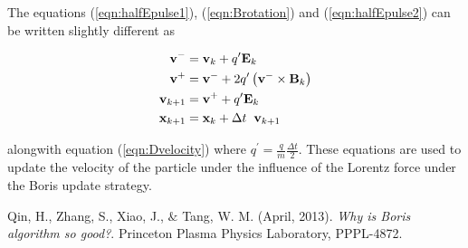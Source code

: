 \documentclass[12pt]{article}
\begin{document}
{		\noindent
		The equations (\ref{eqn:halfEpulse1}), (\ref{eqn:Brotation}) and (\ref{eqn:halfEpulse2}) can be written slightly different as 
		 
		 \begin{center}
		 \begin{tcolorbox}[width=8cm]
		 
		 \begin{equation}
		 		\begin{split}
		 		\textbf{v}^{-} & = \textbf{v}_{k} + q^{\prime} \textbf{E}_{k} \\
		 		\textbf{v}^{+} & = \textbf{v}^{-} + 2 q^{\prime} \left( \textbf{v}^{-} \times \textbf{B}_{k} \right) \\
		 		\textbf{v}_{k+1} & = \textbf{v}^{+} + q^{\prime} \textbf{E}_{k} \\
		 		\textbf{x}_{k+1} & = \textbf{x}_{k} + \Delta t \hspace{0.2cm}\textbf{v}_{k+1}
		 		\end{split}	 			
	 	\end{equation}
		\end{tcolorbox}
		\end{center}
	
	alongwith equation (\ref{eqn:Dvelocity}) where $q^{\prime} = \frac{\displaystyle q}{\displaystyle m} \frac{\displaystyle \Delta t}{ 2}$. These equations are used to update the velocity of the particle under the influence of the Lorentz force under the Boris update strategy.
	
	\begin{thebibliography}{}
		Qin, H., Zhang, S., Xiao, J., $\&$ Tang, W. M. (April, 2013). \textit{Why is Boris algorithm so good?}. Princeton Plasma Physics Laboratory, PPPL-4872.
		
	\end{thebibliography}	
}	
\end{document}
